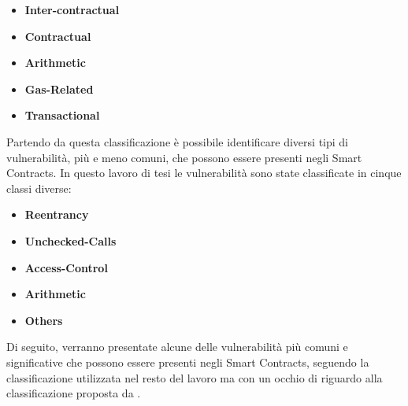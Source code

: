 \documentclass[../../Thesis.tex]{subfiles}
\begin{document}
\begin{itemize}
    \item \textbf{Inter-contractual}
    \item \textbf{Contractual}
    \item \textbf{Arithmetic}
    \item \textbf{Gas-Related}
    \item \textbf{Transactional}
\end{itemize}

Partendo da questa classificazione è possibile identificare diversi tipi di vulnerabilità, più e meno comuni, che possono essere presenti negli Smart Contracts. In questo lavoro di tesi le vulnerabilità sono state classificate in cinque classi diverse:
\begin{itemize}
    \item \textbf{Reentrancy}
    \item \textbf{Unchecked-Calls}
    \item \textbf{Access-Control}
    \item \textbf{Arithmetic}
    \item \textbf{Others}
\end{itemize}

Di seguito, verranno presentate alcune delle vulnerabilità più comuni e significative che possono essere presenti negli Smart Contracts, seguendo la classificazione utilizzata nel resto del lavoro ma con un occhio di riguardo alla classificazione proposta da \cite{sc-vulnerabilities}.
\end{document}
